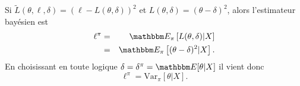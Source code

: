 \begin{rep} %
Si $\tilde{L}(\theta,\ell,\delta)=(\ell-L(\theta,\delta))^2$ et $L(\theta,\delta)=(\theta-\delta)^2$, alors l'estimateur bayésien est
\begin{eqnarray*}
\ell^{\pi}  & = & \E_{\pi}\left[L(\theta,\delta)|X \right] \\
& = &  \E_{\pi}\left[(\theta-\delta)^2|X\right].
\end{eqnarray*}
En choisissant en toute logique $\delta=\delta^{\pi}=\E[\theta|X]$ il vient donc
$$
\ell^{\pi}  = \mbox{Var}_{\pi}[\theta|X].
$$
\end{rep}